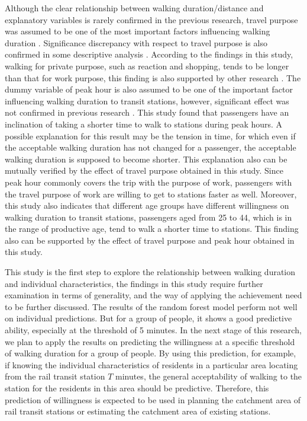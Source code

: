 \documentclass[sustainability,article,submit,moreauthors,pdftex,10pt,a4paper]{Definitions/mdpi}
\begin{document}
%
Although the clear relationship between walking duration/distance and explanatory variables is rarely confirmed in the previous research, travel purpose was assumed to be one of the most important factors influencing walking duration \cite{krygsman2004multimodal,yang2012walking}. Significance discrepancy with respect to travel purpose is also confirmed in some descriptive analysis \cite{burke2007distances,hoback2008true}. According to the findings in this study, walking for private purpose, such as reaction and shopping, tends to be longer than that for work purpose, this finding is also supported by other research \cite{yang2012walking}. The dummy variable of peak hour is also assumed to be one of the important factor influencing walking duration to transit stations, however, significant effect was not confirmed in previous research \cite{daniels2013explaining,krygsman2004multimodal}. This study found that passengers have an inclination of taking a shorter time to walk to stations during peak hours. A possible explanation for this result may be the tension in time, for which even if the acceptable walking duration has not changed for a passenger, the acceptable walking duration is supposed to become shorter. This explanation also can be mutually verified by the effect of travel purpose obtained in this study. Since peak hour commonly covers the trip with the purpose of work, passengers with the travel purpose of work are willing to get to stations faster as well. Moreover, this study also indicates that different age groups have different willingness on walking duration to transit stations, passengers aged from 25 to 44, which is in the range of productive age, tend to walk a shorter time to stations. This finding also can be supported by the effect of travel purpose and peak hour obtained in this study.


This study is the first step to explore the relationship between walking duration and individual characteristics, the findings in this study require further examination in terms of generality, and the way of applying the achievement need to be further discussed. The results of the random forest model perform not well on individual predictions. But for a group of people, it shows a good predictive ability, especially at the threshold of 5 minutes. In the next stage of this research, we plan to apply the results on predicting the willingness at a specific threshold of walking duration for a group of people. By using this prediction, for example, if knowing the individual characteristics of residents in a particular area locating from the rail transit station $T$ minutes, the general acceptability of walking to the station for the residents in this area should be predictive. Therefore, this prediction of willingness is expected to be used in planning the catchment area of rail transit stations or estimating the catchment area of existing stations.
\end{document}
